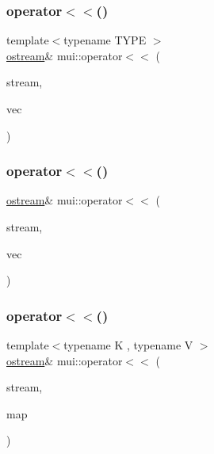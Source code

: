 \subsubsection{\texorpdfstring{operator$<$$<$()}{operator<<()}\hspace{0.1cm}{\footnotesize\ttfamily [5/21]}}
{\footnotesize\ttfamily template$<$typename T\+Y\+PE $>$ \\
\hyperlink{classmui_1_1ostream}{ostream}\& mui\+::operator$<$$<$ (\begin{DoxyParamCaption}\item[{\hyperlink{classmui_1_1ostream}{ostream} \&}]{stream,  }\item[{const std\+::vector$<$ T\+Y\+PE $>$ \&}]{vec }\end{DoxyParamCaption})\hspace{0.3cm}{\ttfamily [inline]}}

\mbox{\label{namespacemui_abbd4806303696928dad09b28de5657c6}} 
\subsubsection{\texorpdfstring{operator$<$$<$()}{operator<<()}\hspace{0.1cm}{\footnotesize\ttfamily [6/21]}}
{\footnotesize\ttfamily \hyperlink{classmui_1_1ostream}{ostream}\& mui\+::operator$<$$<$ (\begin{DoxyParamCaption}\item[{\hyperlink{classmui_1_1ostream}{ostream} \&}]{stream,  }\item[{const std\+::vector$<$ char $>$ \&}]{vec }\end{DoxyParamCaption})\hspace{0.3cm}{\ttfamily [inline]}}

\mbox{\label{namespacemui_ae1313f9a9f6b09da631252d3e0b1e816}} 
\subsubsection{\texorpdfstring{operator$<$$<$()}{operator<<()}\hspace{0.1cm}{\footnotesize\ttfamily [7/21]}}
{\footnotesize\ttfamily template$<$typename K , typename V $>$ \\
\hyperlink{classmui_1_1ostream}{ostream}\& mui\+::operator$<$$<$ (\begin{DoxyParamCaption}\item[{\hyperlink{classmui_1_1ostream}{ostream} \&}]{stream,  }\item[{const std\+::multimap$<$ K, V $>$ \&}]{map }\end{DoxyParamCaption})\hspace{0.3cm}{\ttfamily [inline]}}

